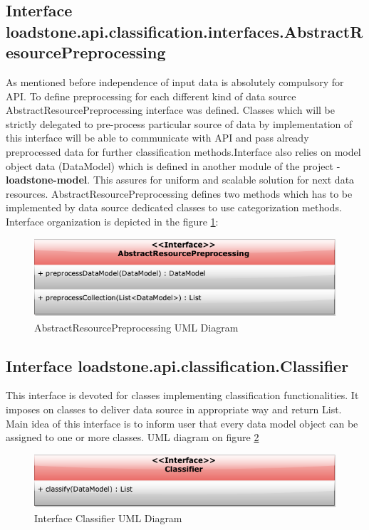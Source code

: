 \subsection{Interface \newline loadstone.api.classification.interfaces.\newline AbstractResourcePreprocessing}
As mentioned before independence of input data is absolutely compulsory for API. To define preprocessing for each different kind of data source  AbstractResourcePreprocessing interface was defined. Classes which will be strictly delegated to pre-process particular source of data by implementation of this interface will be able to communicate with API and pass already preprocessed data for further classification methods.Interface also relies on model object data (DataModel) which is defined in another module of the project - \textbf{loadstone-model}. This assures for uniform and scalable solution for next data resources. AbstractResourcePreprocessing defines two methods which has to be implemented by data source dedicated classes to use categorization methods. Interface organization is depicted in the figure \ref{fig:@=AbstractResourcePreprocessing}:
\begin{figure}[h]
	\centering
	\includegraphics[scale=0.5]{AbstractResourcePreprocessing.png}
	\caption{AbstractResourcePreprocessing UML Diagram}
	\label{fig:@=AbstractResourcePreprocessing}
\end{figure}
\subsection{Interface \newline loadstone.api.classification.Classifier}
This interface is devoted for classes implementing classification functionalities. It imposes on classes to deliver data source in appropriate way and return List. Main idea of this interface is to inform user that every data model object can be assigned to one or more classes. UML diagram on figure \ref{fig:@=classifier}
\begin{figure}[h]
	\centering
	\includegraphics[scale=0.5]{classifier_interface.png}
	\caption{Interface Classifier UML Diagram}
	\label{fig:@=classifier}
\end{figure}
